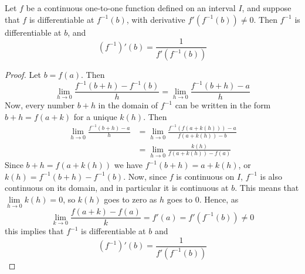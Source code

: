\begin{thm}
    Let $f$ be a continuous one-to-one function defined on an interval $I$, and suppose that $f$ is differentiable at $f^{-1}(b)$, with derivative $f'(f^{-1}(b)) \neq 0$. Then $f^{-1}$ is differentiable at $b$, and \begin{equation}
        (f^{-1})'(b) = \frac{1}{f'(f^{-1}(b))}
    \end{equation}
\end{thm}
\begin{proof}
    Let $b = f(a)$. Then \begin{equation*}
        \lim\limits_{h\rightarrow 0}\frac{f^{-1}(b+h)-f^{-1}(b)}{h} = \lim\limits_{h\rightarrow 0}\frac{f^{-1}(b+h) - a}{h}
    \end{equation*}
    Now, every number $b+h$ in the domain of $f^{-1}$ can be written in the form $b+h = f(a+k)$ for a unique $k(h)$. Then \begin{align*}
        \lim\limits_{h\rightarrow 0}\frac{f^{-1}(b+h) - a}{h} &= \lim\limits_{h\rightarrow 0}\frac{f^{-1}(f(a+k(h)))-a}{f(a+k(h))-b} \\
        &= \lim\limits_{h\rightarrow 0}\frac{k(h)}{f(a+k(h))-f(a)}
    \end{align*}
    Since $b+h = f(a+k(h))$ we have $f^{-1}(b+h) = a+k(h)$, or $k(h) = f^{-1}(b+h)-f^{-1}(b)$. Now, since $f$ is continuous on $I$, $f^{-1}$ is also continuous on its domain, and in particular it is continuous at $b$. This means that $\lim\limits_{h\rightarrow 0}k(h) = 0$, so $k(h)$ goes to zero as $h$ goes to $0$. Hence, as $$\lim\limits_{k\rightarrow 0}\frac{f(a+k)-f(a)}{k} = f'(a) = f'(f^{-1}(b)) \neq 0$$ this implies that $f^{-1}$ is differentiable at $b$ and \begin{equation*}
        (f^{-1})'(b) = \frac{1}{f'(f^{-1}(b))}
    \end{equation*}
\end{proof}

